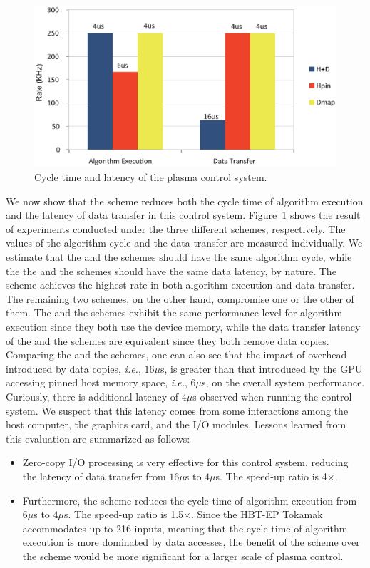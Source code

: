 \begin{figure}[t]
 \centering
 \includegraphics[width=\hsize]{eps/eval_plasma.eps}
 \caption{Cycle time and latency of the plasma control system.}
 \label{fig:eval_plasma}
\end{figure}

We now show that the {\dm} scheme reduces both the cycle time of
algorithm execution and the latency of data transfer in this control
system.
Figure~\ref{fig:eval_plasma} shows the result of experiments conducted
under the three different schemes, respectively.
The values of the algorithm cycle and the data transfer are measured
individually.
We estimate that the {\dm} and the {\hd} schemes should have the same
algorithm cycle, while the the {\dm} and the {\hp} schemes should
have the same data latency, by nature.
The {\dm} scheme achieves the highest rate in both algorithm
execution and data transfer.
The remaining two schemes, on the other hand, compromise one or the
other of them.
The {\hd} and the {\dm} schemes exhibit the same performance level for
algorithm execution since they both use the device memory, while the
data transfer latency of the {\hp} and the {\dm} schemes are equivalent
since they both remove data copies.
Comparing the {\hd} and the {\hp} schemes, one can also see that the
impact of overhead introduced by data copies, \textit{i.e.}, $16\mu$s, is
greater than that introduced by the GPU accessing pinned host memory
space, \textit{i.e.}, $6\mu$s, on the overall system performance.
Curiously, there is additional latency of $4\mu$s observed when running
the control system.
We suspect that this latency comes from some interactions among the host
computer, the graphics card, and the I/O modules.
Lessons learned from this evaluation are summarized as follows:
\begin{itemize} \itemsep1pt
 \item Zero-copy I/O processing is very effective for this control
       system, reducing the latency of data transfer from $16\mu$s to
       $4\mu$s.
       The speed-up ratio is 4$\times$.
 \item Furthermore, the {\dm} scheme reduces the cycle time of algorithm
       execution from $6\mu$s to $4\mu$s.
       The speed-up ratio is 1.5$\times$.
       Since the HBT-EP Tokamak accommodates up to 216 inputs,
       meaning that the cycle time of algorithm execution is more
       dominated by data accesses, the benefit of the {\dm} scheme over
       the {\hp} scheme would be more significant for a larger scale of
       plasma control.
\end{itemize}


